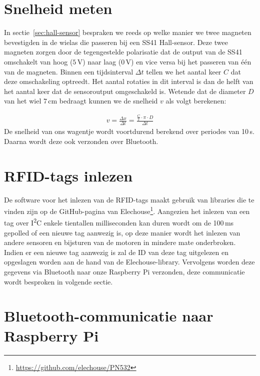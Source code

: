 \section{Snelheid meten}
In sectie~\vref{sec:hall-sensor} bespraken we reeds op welke manier we twee magneten bevestigden in de wielas die passeren bij een SS41 Hall-sensor.
Deze twee magneten zorgen door de tegengestelde polarisatie dat de output van de SS41 omschakelt van hoog ($5\,\mathrm{V}$) naar laag ($0\,\mathrm{V}$) en vice versa bij het passeren van \'e\'en van de magneten. 
Binnen een tijdsinterval $\Delta t$ tellen we het aantal keer $C$ dat deze omschakeling optreedt. Het aantal rotaties in dit interval is dan de helft van het aantal keer dat de sensoroutput omgeschakeld is. Wetende dat de diameter $D$ van het wiel $7\,\mathrm{cm}$ bedraagt kunnen we de snelheid $v$ als volgt berekenen:

\begin{gather*}
v=\frac{\Delta x}{\Delta t} = \frac{\frac{C}{2}\cdot\pi\cdot D}{\Delta t}
\end{gather*}
De snelheid van ons wagentje wordt voortdurend berekend over periodes van 10\,s. Daarna wordt deze ook verzonden over Bluetooth.

\section{RFID-tags inlezen}
De software voor het inlezen van de RFID-tags maakt gebruik van libraries die te vinden zijn op de GitHub-pagina van Elechouse\footnote{\url{https://github.com/elechouse/PN532}}. Aangezien het inlezen van een tag over I\textsuperscript{2}C enkele tientallen milliseconden kan duren wordt om de 100\,ms gepolled of een nieuwe tag aanwezig is, op deze manier wordt het inlezen van andere sensoren en bijsturen van de motoren in mindere mate onderbroken. Indien er een nieuwe tag aanwezig is zal de ID van deze tag uitgelezen en opgeslagen worden aan de hand van de Elechouse-library. Vervolgens worden deze gegevens via Bluetooth naar onze Raspberry Pi verzonden, deze communicatie wordt besproken in volgende sectie.

\section{Bluetooth-communicatie naar Raspberry Pi}\label{sec:bluetooth-communicatie-naar-raspberry-pi}
